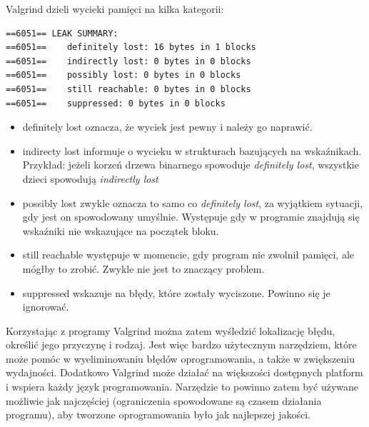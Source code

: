 \documentclass[12pt]{article}
\begin{document}
Valgrind dzieli wycieki pamięci na kilka kategorii:
\begin{lstlisting}
==6051== LEAK SUMMARY:
==6051==    definitely lost: 16 bytes in 1 blocks
==6051==    indirectly lost: 0 bytes in 0 blocks
==6051==    possibly lost: 0 bytes in 0 blocks
==6051==    still reachable: 0 bytes in 0 blocks
==6051==    suppressed: 0 bytes in 0 blocks
\end{lstlisting}
\begin{itemize}
  \item definitely lost oznacza, że wyciek jest pewny i należy go naprawić.
  \item indirecty lost informuje o wycieku w strukturach bazujących na wskaźnikach. Przykład: jeżeli korzeń drzewa binarnego spowoduje \textit{definitely lost}, wszystkie dzieci spowodują \textit{indirectly lost}
  \item possibly lost zwykle oznacza to samo co \textit{definitely lost}, za wyjątkiem sytuacji, gdy jest on spowodowany umyślnie. Występuje gdy w programie znajdują się wskaźniki nie wskazujące na początek bloku.
  \item still reachable występuje w momencie, gdy program nie zwolnił pamięci, ale mógłby to zrobić. Zwykle nie jest to znaczący problem.
  \item suppressed wskazuje na błędy, które zostały wyciszone. Powinno się je ignorować.
\end{itemize}
Korzystając z programy Valgrind można zatem wyśledzić lokalizację błędu, określić jego przyczynę i rodzaj. Jest więc bardzo użytecznym narzędziem, które może pomóc w wyeliminowaniu błędów oprogramowania, a także w zwiększeniu wydajności. Dodatkowo Valgrind może działać na większości dostępnych platform i wspiera każdy język programowania. Narzędzie to powinno zatem być używane możliwie jak najczęściej (ograniczenia spowodowane są czasem działania programu), aby tworzone oprogramowania było jak najlepszej jakości. 
\newpage
\end{document}
